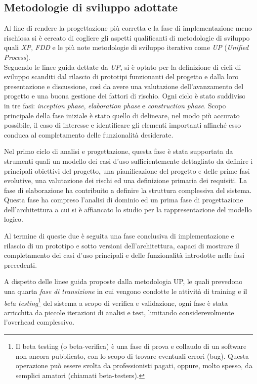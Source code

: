 \subsection{Metodologie di sviluppo adottate}
Al fine di rendere la progettazione più corretta e la fase di implementazione meno rischiosa si è cercato di cogliere gli aspetti qualificanti di metodologie di sviluppo quali \textit{XP}, \textit{FDD} e le più note metodologie di sviluppo iterativo come \textit{UP} (\emph{Unified Process}).\\
Seguendo le linee guida dettate da \textit{UP}, si è optato per la definizione di cicli di sviluppo scanditi dal rilascio di prototipi funzionanti del progetto e dalla loro presentazione e discussione, così da avere una valutazione dell'avanzamento del progetto e una buona gestione dei fattori di rischio. Ogni ciclo è stato suddiviso in tre fasi: \textit{inception phase}, \textit{elaboration phase} e \textit{construction phase}.
Scopo principale della fase iniziale è stato quello di delineare, nel modo più accurato possibile, il caso di interesse e identificare gli elementi importanti affinché esso conduca al completamento delle funzionalità desiderate.

Nel primo ciclo di analisi e progettazione, questa fase è stata supportata da strumenti quali un modello dei casi d'uso sufficientemente dettagliato da definire i principali obiettivi del progetto, una pianificazione del progetto e delle prime fasi evolutive, una valutazione dei rischi ed una definizione primaria dei requisiti.
La fase di elaborazione ha contribuito a definire la struttura complessiva del sistema. Questa fase ha compreso l'analisi di dominio ed un prima fase di progettazione dell'architettura a cui si è affiancato lo studio per la rappresentazione del modello logico.

Al termine di queste due è seguita una fase conclusiva di implementazione e rilascio di un prototipo e sotto versioni dell'architettura, capaci di mostrare il completamento dei casi d'uso principali e delle funzionalità introdotte nelle fasi precedenti.

A dispetto delle linee guida proposte dalla metodologia UP, le quali prevedono una quarta \textit{fase di transizione} in cui vengono condotte le attività di training e il \textit{beta testing}\footnote{Il beta testing (o beta-verifica) è una fase di prova e collaudo di un software non ancora pubblicato, con lo scopo di trovare eventuali errori (bug). Questa operazione può essere svolta da professionisti pagati, oppure, molto spesso, da semplici amatori (chiamati beta-testers).} del sistema a scopo di verifica e validazione, ogni fase è stata arricchita da piccole iterazioni di analisi e test, limitando considerevolmente l'overhead complessivo.

